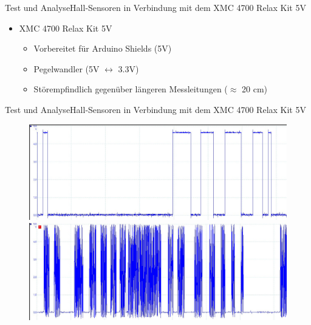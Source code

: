 \begin{frame}{Test und Analyse}{Hall-Sensoren in Verbindung mit dem XMC 4700 Relax Kit 5V}
	\begin{itemize}
		\item XMC 4700 Relax Kit 5V
		\begin{itemize}
			\item Vorbereitet für Arduino Shields (5V)
			\item Pegelwandler (5V $\leftrightarrow$ 3.3V)
			\item Störempfindlich gegenüber längeren Messleitungen ($\approx$ 20 cm)
		\end{itemize}
	\end{itemize}
\vspace{\baselineskip}
\vspace{\baselineskip}
\end{frame}

\begin{frame}{Test und Analyse}{Hall-Sensoren in Verbindung mit dem XMC 4700 Relax Kit 5V}
	\begin{figure}
		\includegraphics[height=0.4\textheight]{Test/hall_ok}
		\vspace{\baselineskip}
		\includegraphics[height=0.4\textheight]{Test/hall_jitter_4700}
	\end{figure}
\end{frame}


